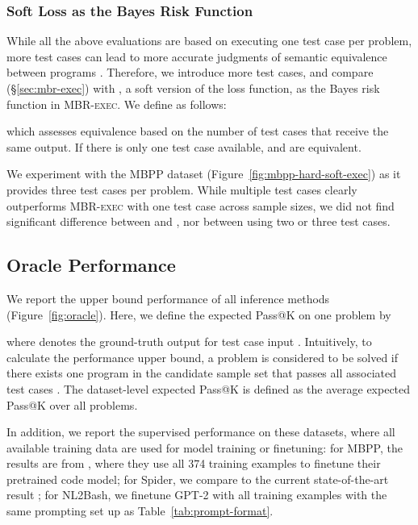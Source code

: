 \documentclass[11pt]{article}
\newcommand{\mbrexec}{\textsc{MBR-exec}\xspace}
\begin{document}
\subsubsection{Soft Loss as the Bayes Risk Function}
While all the above evaluations are based on executing one test case per problem, more test cases can lead to more accurate judgments of semantic equivalence between programs \citep{zhong-etal-2020-semantic}. 
Therefore, we introduce more test cases, and compare  (\S\ref{sec:mbr-exec}) with , a soft version of the loss function, as the Bayes risk function in \mbrexec. We define  as follows:

which assesses equivalence based on the number of test cases that receive the same output. If there is only one test case available,  and  are equivalent.

We experiment with the MBPP dataset (Figure~\ref{fig:mbpp-hard-soft-exec}) as it provides three test cases per problem. While multiple test cases clearly outperforms \mbrexec with one test case across sample sizes, we did not find significant difference between  and , nor between using two or three test cases.  \subsection{Oracle Performance}
\label{sec:expr-oracle}
We report the upper bound performance of all inference methods (Figure~\ref{fig:oracle}). Here, we define the expected Pass@K on one problem  by 

where  denotes the ground-truth output for test case input . 
Intuitively, to calculate the performance upper bound, a problem  is considered to be solved if there exists one program in the candidate sample set  that passes all associated test cases . The dataset-level expected Pass@K is defined as the average expected Pass@K over all problems.

In addition, we report the supervised performance on these datasets, where all available training data are used for model training or finetuning: for MBPP, the results are from \citet{austin2021program}, where they use all 374 training examples to finetune their pretrained code model; for Spider, we compare to the current state-of-the-art result  \citep{scholak-etal-2021-picard}; for NL2Bash, we finetune GPT-2 \citep{radford2019language} with all training examples with the same prompting set up as Table~\ref{tab:prompt-format}.
\end{document}
